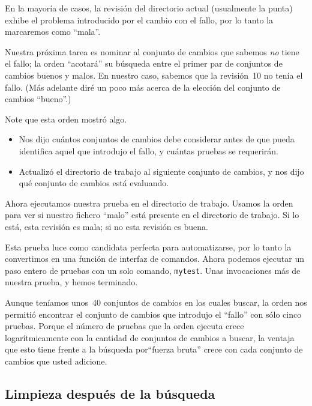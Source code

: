 En la mayoría de casos, la revisión del directorio actual (usualmente
la punta) exhibe el problema introducido por el cambio con el fallo,
por lo tanto la marcaremos como ``mala''.

Nuestra próxima tarea es nominar al conjunto de cambios que sabemos
\emph{no} tiene el fallo; la orden  ``acotará'' su
búsqueda entre el primer par de conjuntos de cambios buenos y malos.
En nuestro caso, sabemos que la revisión~10 no tenía el fallo.  (Más
adelante diré un poco más acerca de la elección del conjunto de
cambios ``bueno''.)

Note que esta orden mostró algo.
\begin{itemize}
\item Nos dijo cuántos conjuntos de cambios debe considerar antes de
  que pueda identifica aquel que introdujo el fallo, y cuántas pruebas
  se requerirán.
\item Actualizó el directorio de trabajo al siguiente conjunto de
  cambios, y nos dijo qué conjunto de cambios está evaluando.
\end{itemize}

Ahora ejecutamos nuestra prueba en el directorio de trabajo. Usamos la
orden  para ver si nuestro fichero ``malo'' está
presente en el directorio de trabajo.  Si lo está, esta revisión es
mala; si no esta revisión es buena.

Esta prueba luce como candidata perfecta para automatizarse, por lo
tanto la convertimos en una función de interfaz de comandos.
Ahora podemos ejecutar un paso entero de pruebas con un solo comando,
\texttt{mytest}.
Unas invocaciones más de nuestra prueba, y hemos terminado.

Aunque teníamos unos~40 conjuntos de cambios en los cuales buscar, la
orden  nos permitió encontrar el conjunto de cambios que
introdujo el ``fallo'' con sólo cinco pruebas.  Porque el número de
pruebas que la orden  ejecuta crece logarítmicamente con
la cantidad de conjuntos de cambios a buscar, la ventaja que esto
tiene frente a la  búsqueda por``fuerza bruta'' crece con cada
conjunto de cambios que usted adicione.

\subsection{Limpieza después de la búsqueda}

